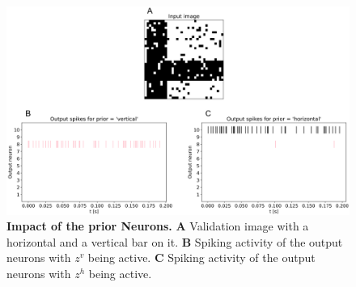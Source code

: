 \begin{figure}
  \includegraphics[width=\linewidth]{figures/horvertAdaptiveInh/20priors_pos5and12/crossValidation.png}
  \caption{\textbf{Impact of the prior Neurons.} \textbf{A} Validation image with a horizontal and a vertical bar on it. \textbf{B} Spiking activity of the output neurons with $z^v$ being active. \textbf{C} Spiking activity of the output neurons with $z^h$ being active. }
  \label{fig:horvertAdaptiveInhibitionPriorValResults}
\end{figure}

